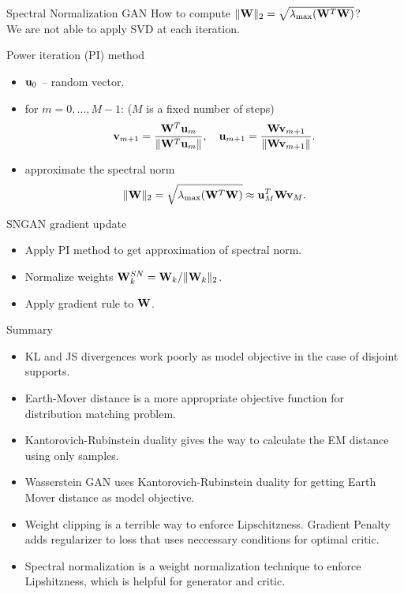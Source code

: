 \begin{frame}{Spectral Normalization GAN}
	How to compute $ \| \mathbf{W} \|_2 = \sqrt{\lambda_{\text{max}}(\mathbf{W}^T \mathbf{W})}$? \\
	We are not able to apply SVD at each iteration.
	 \begin{block}{Power iteration (PI) method}
	 	\vspace{-0.2cm}
	 	\begin{itemize}
	 		\item $\mathbf{u}_0$ -- random vector.
	 		\item for $m = 0, \dots, M - 1$: ($M$ is a fixed number of steps)
	 		\vspace{-0.3cm}
	 		\[
	 			\mathbf{v}_{m+1} = \frac{\mathbf{W}^T \mathbf{u}_{m}}{\| \mathbf{W}^T \mathbf{u}_{m} \|}, \quad \mathbf{u}_{m+1} = \frac{\mathbf{W} \mathbf{v}_{m+1}}{\| \mathbf{W} \mathbf{v}_{m+1} \|}.
	 		\]
	 		\item approximate the spectral norm
	 		\vspace{-0.3cm}
	 		\[
	 			\| \mathbf{W} \|_2 = \sqrt{\lambda_{\text{max}}(\mathbf{W}^T \mathbf{W})} \approx \mathbf{u}_{M}^T \mathbf{W} \mathbf{v}_{M}.
	 		\]
	 	\end{itemize}
	 \end{block}
	 \vspace{-0.5cm}
 	\begin{block}{SNGAN gradient update}
 		\begin{itemize}
 			\item Apply PI method to get approximation of spectral norm.
 			\item Normalize weights $\mathbf{W}^{SN}_k = \mathbf{W}_k / \|\mathbf{W}_k\|_2$.
 			\item Apply gradient rule to $\mathbf{W}$.
 		\end{itemize}
 	\end{block}

\end{frame}
\begin{frame}{Summary}
	\begin{itemize}
		\item KL and JS divergences work poorly as model objective in the case of disjoint supports.
		\vfill
		\item Earth-Mover distance is a more appropriate objective function for distribution matching problem.	
		\vfill
		\item Kantorovich-Rubinstein duality gives the way to calculate the EM distance using only samples.
		\vfill
		\item Wasserstein GAN uses Kantorovich-Rubinstein duality for getting Earth Mover distance as model objective.
		\vfill
		\item Weight clipping is a terrible way to enforce Lipschitzness. Gradient Penalty adds regularizer to loss that uses neccessary conditions for optimal critic.
		\vfill
		\item Spectral normalization is a weight normalization technique to enforce Lipshitzness, which is helpful for generator and critic.
	\end{itemize}
\end{frame}
 